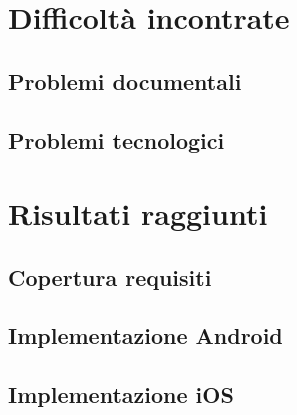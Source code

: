 \section{Difficoltà incontrate}
\subsection{Problemi documentali}
\subsection{Problemi tecnologici}


\section{Risultati raggiunti}
\subsection{Copertura requisiti}
\subsection{Implementazione Android}
\subsection{Implementazione iOS}
